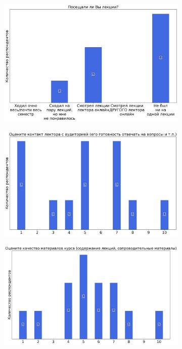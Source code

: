 		\begin{figure}[H]
			\centering
            \begin{subfigure}[b]{0.45\textwidth}
				\centering
				\includegraphics[width=\textwidth]{images/4 course/Основы финансово-экономического анализа и планирования/lecturer-questions-Старостин Е.А.-0.png}
			\end{subfigure}
			\begin{subfigure}[b]{0.45\textwidth}
				\centering
				\includegraphics[width=\textwidth]{images/4 course/Основы финансово-экономического анализа и планирования/lecturer-marks-Старостин Е.А.-0.png}
			\end{subfigure}
			\begin{subfigure}[b]{0.45\textwidth}
				\centering
				\includegraphics[width=\textwidth]{images/4 course/Основы финансово-экономического анализа и планирования/lecturer-marks-Старостин Е.А.-1.png}

\end{subfigure}
\end{figure}
